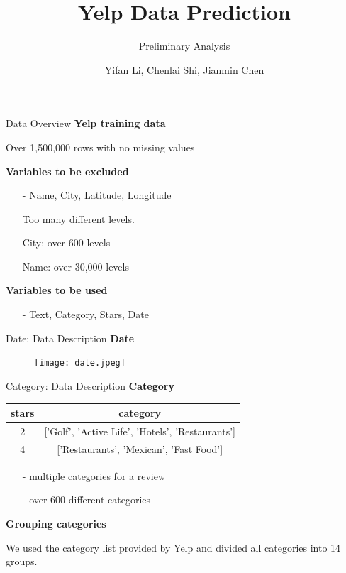 \documentclass[10pt]{beamer}
\title{Yelp Data Prediction}
\subtitle{Preliminary Analysis}
\date{}
\author{Yifan Li, Chenlai Shi, Jianmin Chen}
\institute{Monday Group 1}
\begin{document}
\maketitle

\begin{frame}{Data Overview}
\textbf{Yelp training data} 

Over 1,500,000 rows with no missing values

\textbf{Variables to be excluded}
\begin{itemize}
    \item[-] Name, City, Latitude, Longitude
    
    Too many different levels.
    
    City: over 600 levels
    
    Name: over 30,000 levels
\end{itemize}

\textbf{Variables to be used}
\begin{itemize}
    \item[-] Text, Category, Stars, Date
\end{itemize}
\end{frame}

\begin{frame}{Date: Data Description}
\textbf{Date}
\begin{figure}
    \centering
    \texttt{[image: date.jpeg]}
\end{figure}    
\end{frame}

\begin{frame}{Category: Data Description}
\textbf{Category}

\begin{table}[]
\centering
\label{my-label}
\begin{tabular}{c|c}
\hline
stars & category          \\
\hline
2     & {[}'Golf', 'Active Life', 'Hotels', 'Restaurants'{]}    \\
\hline
4     & {[}'Restaurants', 'Mexican', 'Fast Food'{]} \\
\hline
\end{tabular}
\end{table}
\begin{itemize}
    \item[-] multiple categories for a review
    \item[-] over 600 different categories
\end{itemize}

\textbf{Grouping categories}

We used the category list provided by Yelp and divided all categories into 14 groups. 
\end{frame}
\end{document}
